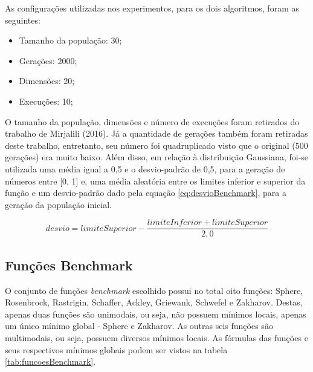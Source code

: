 As configurações utilizadas nos experimentos, para os dois algoritmos, foram as seguintes:

\begin{itemize}
    \item Tamanho da população: 30;
    \item Gerações: 2000;
    \item Dimensões: 20;
    \item Execuções: 10;
\end{itemize}

O tamanho da população, dimensões e número de execuções foram retirados do trabalho de Mirjalili (2016). Já a quantidade de gerações também foram retiradas deste trabalho, entretanto, seu número foi quadruplicado visto que o original (500 gerações) era muito baixo. Além disso, em relação à distribuição Gaussiana, foi-se utilizada uma média igual a 0,5 e o desvio-padrão de 0,5, para a geração de números entre [0, 1] e, uma média aleatória entre os limites inferior e superior da função e um desvio-padrão dado pela equação \ref{eq:desvioBenchmark}, para a geração da população inicial.

\begin{equation}
\label{eq:desvioBenchmark}
    desvio = limiteSuperior - \frac{limiteInferior+limiteSuperior}{2,0}
\end{equation}

\subsection{Funções Benchmark}

O conjunto de funções \textit{benchmark} escolhido possui no total oito funções: Sphere, Rosenbrock, Rastrigin, Schaffer, Ackley, Griewank, Schwefel e Zakharov. Destas, apenas duas funções são unimodais, ou seja, não possuem mínimos locais, apenas um único mínimo global - Sphere e Zakharov. As outras seis funções são multimodais, ou seja, possuem diversos mínimos locais. As fórmulas das funções e seus respectivos mínimos globais podem ser vistos na tabela \ref{tab:funcoesBenchmark}.


